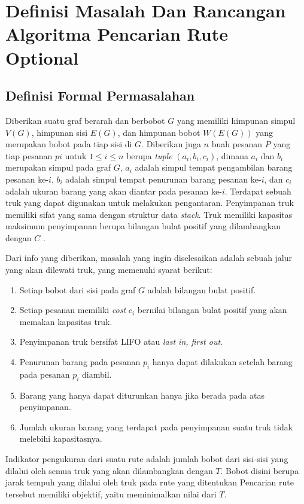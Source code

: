 \chapter{Definisi Masalah Dan Rancangan Algoritma Pencarian Rute Optional}

\section{Definisi Formal Permasalahan}

Diberikan suatu graf berarah dan berbobot $G$ yang memiliki himpunan simpul $V(G)$, himpunan sisi $E(G)$, dan himpunan bobot $W(E(G))$ yang merupakan 
bobot pada tiap sisi di $G$. Diberikan juga $n$ buah pesanan $P$ yang tiap pesanan $pi$ untuk $1 \leq i \leq n$ berupa \textit{tuple} $(a_{i}, b_{i}, c_{i})$, 
dimana $a_{i}$ dan $b_{i}$ merupakan simpul pada graf $G$, $a_{i}$ adalah simpul tempat pengambilan barang pesanan ke-$i$, $b_{i}$ adalah simpul tempat penurunan 
barang pesanan ke-$i$, dan $c_{i}$ adalah ukuran barang yang akan diantar pada pesanan ke-$i$. Terdapat sebuah truk yang dapat digunakan untuk melakukan pengantaran.
Penyimpanan truk memiliki sifat yang sama dengan struktur data \textit{stack}. Truk memiliki kapasitas maksimum penyimpanan 
berupa bilangan bulat positif yang dilambangkan dengan $C$ .

Dari info yang diberikan, masalah yang ingin diselesaikan adalah sebuah jalur yang akan dilewati truk, yang memenuhi syarat berikut:
\begin{enumerate}
    \item Setiap bobot dari sisi pada graf $G$ adalah bilangan bulat positif.
    \item Setiap pesanan memiliki \textit{cost} $c_{i}$ bernilai bilangan bulat positif yang akan memakan kapasitas truk.
    \item Penyimpanan truk bersifat LIFO atau \textit{last in, first out}.
    \item Penurunan barang pada pesanan $p_{i}$ hanya dapat dilakukan setelah barang pada pesanan $p_{i}$ diambil.
    \item Barang yang hanya dapat diturunkan hanya jika berada pada atas penyimpanan.
    \item Jumlah ukuran barang yang terdapat pada penyimpanan suatu truk tidak melebihi kapasitasnya.
\end{enumerate}

Indikator pengukuran dari suatu rute adalah jumlah bobot dari sisi-sisi yang dilalui oleh semua truk yang akan dilambangkan dengan $T$. 
Bobot disini berupa jarak tempuh yang dilalui oleh truk pada rute yang ditentukan
Pencarian rute tersebut memiliki objektif, yaitu meminimalkan nilai dari $T$.

